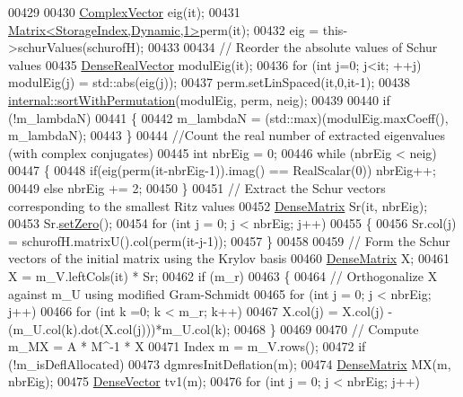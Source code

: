 \begin{DoxyCode}
00429   
00430   \hyperlink{group___core___module_class_eigen_1_1_matrix}{ComplexVector} eig(it);
00431   \hyperlink{group___core___module}{Matrix<StorageIndex,Dynamic,1>}perm(it);
00432   eig = this->schurValues(schurofH);
00433   
00434   \textcolor{comment}{// Reorder the absolute values of Schur values}
00435   \hyperlink{group___core___module}{DenseRealVector} modulEig(it); 
00436   \textcolor{keywordflow}{for} (\textcolor{keywordtype}{int} j=0; j<it; ++j) modulEig(j) = std::abs(eig(j)); 
00437   perm.setLinSpaced(it,0,it-1);
00438   \hyperlink{namespace_eigen_1_1internal_afe2a11c61eff70f7f68681a557fa21e7}{internal::sortWithPermutation}(modulEig, perm, neig);
00439   
00440   \textcolor{keywordflow}{if} (!m\_lambdaN)
00441   \{
00442     m\_lambdaN = (std::max)(modulEig.maxCoeff(), m\_lambdaN);
00443   \}
00444   \textcolor{comment}{//Count the real number of extracted eigenvalues (with complex conjugates)}
00445   \textcolor{keywordtype}{int} nbrEig = 0; 
00446   \textcolor{keywordflow}{while} (nbrEig < neig)
00447   \{
00448     \textcolor{keywordflow}{if}(eig(perm(it-nbrEig-1)).imag() == RealScalar(0)) nbrEig++; 
00449     \textcolor{keywordflow}{else} nbrEig += 2; 
00450   \}
00451   \textcolor{comment}{// Extract the  Schur vectors corresponding to the smallest Ritz values}
00452   \hyperlink{group___core___module}{DenseMatrix} Sr(it, nbrEig); 
00453   Sr.\hyperlink{class_eigen_1_1_plain_object_base_ac21ad5f989f320e46958b75ac8d9a1da}{setZero}();
00454   \textcolor{keywordflow}{for} (\textcolor{keywordtype}{int} j = 0; j < nbrEig; j++)
00455   \{
00456     Sr.col(j) = schurofH.matrixU().col(perm(it-j-1));
00457   \}
00458   
00459   \textcolor{comment}{// Form the Schur vectors of the initial matrix using the Krylov basis}
00460   \hyperlink{group___core___module}{DenseMatrix} X; 
00461   X = m\_V.leftCols(it) * Sr;
00462   \textcolor{keywordflow}{if} (m\_r)
00463   \{
00464    \textcolor{comment}{// Orthogonalize X against m\_U using modified Gram-Schmidt}
00465    \textcolor{keywordflow}{for} (\textcolor{keywordtype}{int} j = 0; j < nbrEig; j++)
00466      \textcolor{keywordflow}{for} (\textcolor{keywordtype}{int} k =0; k < m\_r; k++)
00467       X.col(j) = X.col(j) - (m\_U.col(k).dot(X.col(j)))*m\_U.col(k); 
00468   \}
00469   
00470   \textcolor{comment}{// Compute m\_MX = A * M^-1 * X}
00471   Index m = m\_V.rows();
00472   \textcolor{keywordflow}{if} (!m\_isDeflAllocated) 
00473     dgmresInitDeflation(m); 
00474   \hyperlink{group___core___module}{DenseMatrix} MX(m, nbrEig);
00475   \hyperlink{group___core___module}{DenseVector} tv1(m);
00476   \textcolor{keywordflow}{for} (\textcolor{keywordtype}{int} j = 0; j < nbrEig; j++)

\end{DoxyCode}
